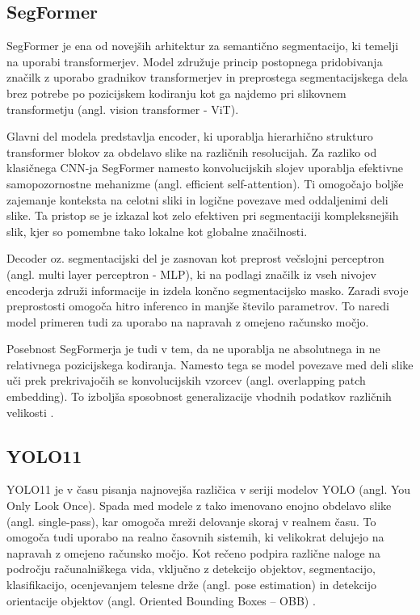 \documentclass[10pt,twocolumn,letterpaper]{article}
\begin{document}
\subsection{SegFormer}

SegFormer je ena od novejših arhitektur za semantično segmentacijo, ki temelji na uporabi transformerjev. Model združuje princip postopnega pridobivanja značilk z uporabo gradnikov transformerjev in preprostega segmentacijskega dela brez potrebe po pozicijskem kodiranju kot ga najdemo pri slikovnem transformetju (angl. vision transformer - ViT)\cite{dosovitskiy2021imageworth16x16words}.

Glavni del modela predstavlja encoder, ki uporablja hierarhično strukturo transformer blokov za obdelavo slike na različnih resolucijah. Za razliko od klasičnega CNN-ja SegFormer namesto konvolucijskih slojev uporablja efektivne samopozornostne mehanizme (angl. efficient self-attention). Ti omogočajo boljše zajemanje konteksta na celotni sliki in logične povezave med oddaljenimi deli slike. Ta pristop se je izkazal kot zelo efektiven pri segmentaciji kompleksnejših slik, kjer so pomembne tako lokalne kot globalne značilnosti.

Decoder oz. segmentacijski del je zasnovan kot preprost večslojni perceptron (angl. multi layer perceptron - MLP), ki na podlagi značilk iz vseh nivojev encoderja združi informacije in izdela končno segmentacijsko masko. Zaradi svoje preprostosti omogoča hitro inferenco in manjše število parametrov. To naredi model primeren tudi za uporabo na napravah z omejeno računsko močjo.

Posebnost SegFormerja je tudi v tem, da ne uporablja ne absolutnega in ne relativnega pozicijskega kodiranja. Namesto tega se model povezave med deli slike uči prek prekrivajočih se konvolucijskih vzorcev (angl. overlapping patch embedding).
To izboljša sposobnost generalizacije vhodnih podatkov različnih velikosti \cite{xie2021segformersimpleefficientdesign}.

\subsection{YOLO11}

YOLO11 je v času pisanja najnovejša različica v seriji modelov YOLO (angl. You Only Look Once). Spada med modele z tako imenovano enojno obdelavo slike (angl. single-pass), kar omogoča mreži delovanje skoraj v realnem času. To omogoča tudi uporabo na realno časovnih sistemih, ki velikokrat delujejo na napravah z omejeno računsko močjo. Kot rečeno podpira različne naloge na področju računalniškega vida, vključno z detekcijo objektov, segmentacijo, klasifikacijo, ocenjevanjem telesne drže (angl. pose estimation) in detekcijo orientacije objektov (angl. Oriented Bounding Boxes – OBB) \cite{ultralytics_docs}.
\end{document}
